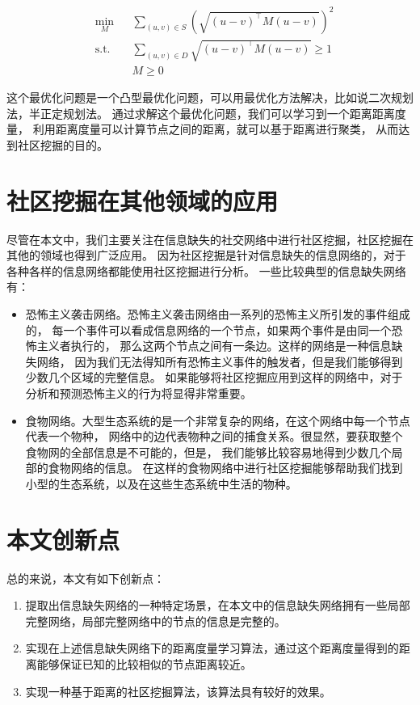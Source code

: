 \begin{equation}
\begin{aligned}
& \underset{M}{\min}
& & \sum_{(u,v) \in S} (\sqrt{(u-v)^\top M (u-v)})^2 \\
& \text{s.t.}
& & \sum_{(u,v) \in D} \sqrt{(u-v)^\top M (u-v)} \geq 1 \\
& & & M \geq 0
\end{aligned}
\end {equation}

这个最优化问题是一个凸型最优化问题，可以用最优化方法解决，比如说二次规划法，半正定规划法。
通过求解这个最优化问题，我们可以学习到一个距离距离度量，
利用距离度量可以计算节点之间的距离，就可以基于距离进行聚类，
从而达到社区挖掘的目的。

\section{社区挖掘在其他领域的应用}

尽管在本文中，我们主要关注在信息缺失的社交网络中进行社区挖掘，社区挖掘在其他的领域也得到广泛应用。
因为社区挖掘是针对信息缺失的信息网络的，对于各种各样的信息网络都能使用社区挖掘进行分析。
一些比较典型的信息缺失网络有：

\begin{itemize}
    \item 恐怖主义袭击网络。恐怖主义袭击网络由一系列的恐怖主义所引发的事件组成的，
    每一个事件可以看成信息网络的一个节点，如果两个事件是由同一个恐怖主义者执行的，
    那么这两个节点之间有一条边。这样的网络是一种信息缺失网络，
    因为我们无法得知所有恐怖主义事件的触发者，但是我们能够得到少数几个区域的完整信息。
    如果能够将社区挖掘应用到这样的网络中，对于分析和预测恐怖主义的行为将显得非常重要。
    \item 食物网络。大型生态系统的是一个非常复杂的网络，在这个网络中每一个节点代表一个物种，
    网络中的边代表物种之间的捕食关系。很显然，要获取整个食物网的全部信息是不可能的，但是，
    我们能够比较容易地得到少数几个局部的食物网络的信息。
    在这样的食物网络中进行社区挖掘能够帮助我们找到小型的生态系统，以及在这些生态系统中生活的物种。
\end{itemize}

\section{本文创新点}

总的来说，本文有如下创新点：

\begin{enumerate}
\item 提取出信息缺失网络的一种特定场景，在本文中的信息缺失网络拥有一些局部完整网络，局部完整网络中的节点的信息是完整的。
\item 实现在上述信息缺失网络下的距离度量学习算法，通过这个距离度量得到的距离能够保证已知的比较相似的节点距离较近。
\item 实现一种基于距离的社区挖掘算法，该算法具有较好的效果。
\end{enumerate}

